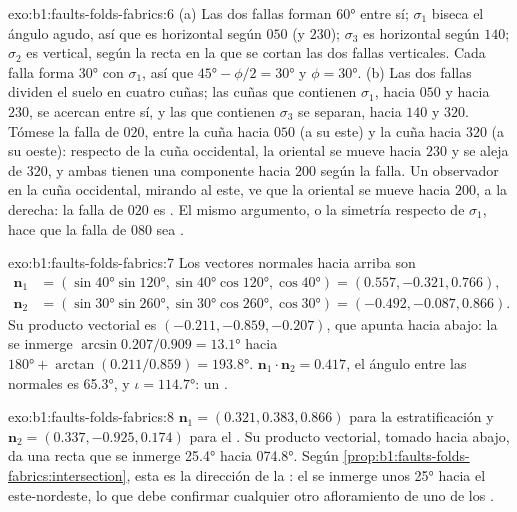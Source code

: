 \begin{solution}{exo:b1:faults-folds-fabrics:6}
(a) Las dos fallas forman \ang{60} entre sí; $\sigma_1$ biseca el ángulo agudo, así que es horizontal según $050$ (y $230$);
$\sigma_3$ es horizontal según $140$; $\sigma_2$ es vertical, según la recta en la que se cortan las dos fallas verticales. Cada
falla forma \ang{30} con $\sigma_1$, así que $\ang{45} - \phi/2 =
\ang{30}$ y $\phi = \ang{30}$. (b) Las dos fallas dividen el suelo en cuatro
cuñas; las cuñas que contienen $\sigma_1$, hacia $050$ y hacia $230$, se acercan entre sí, y las que contienen $\sigma_3$ se separan,
hacia $140$ y $320$. Tómese la falla de  $020$, entre la cuña hacia $050$ (a su
este) y la cuña hacia $320$ (a su oeste): respecto de la cuña occidental, la oriental se
mueve hacia $230$ y se aleja de $320$, y ambas tienen una componente hacia $200$ según la falla. Un observador en la cuña
occidental, mirando al este, ve que la oriental se mueve hacia $200$, a la derecha: la falla de  $020$ es
. El mismo argumento, o la simetría respecto de $\sigma_1$, hace que la falla de  $080$ sea .
\end{solution}

\begin{solution}{exo:b1:faults-folds-fabrics:7}
Los vectores normales hacia arriba son
\begin{align*}
  \mathbf n_1 &= (\sin\ang{40}\sin\ang{120}, \sin\ang{40}\cos\ang{120}, \cos\ang{40}) = (0.557, -0.321, 0.766),\\
  \mathbf n_2 &= (\sin\ang{30}\sin\ang{260}, \sin\ang{30}\cos\ang{260}, \cos\ang{30}) = (-0.492, -0.087, 0.866).
\end{align*}
Su producto vectorial es
$(-0.211, -0.859, -0.207)$, que apunta hacia abajo: la  se inmerge
$\arcsin 0.207/0.909 = \ang{13.1}$ hacia $\ang{180} + \arctan(0.211/0.859) =
\ang{193.8}$. $\mathbf n_1\cdot\mathbf n_2 = 0.417$, el ángulo entre las
normales es \ang{65.3}, y $\iota = \ang{114.7}$: un .
\end{solution}

\begin{solution}{exo:b1:faults-folds-fabrics:8}
$\mathbf n_1 = (0.321, 0.383, 0.866)$ para la estratificación y
$\mathbf n_2 = (0.337, -0.925, 0.174)$ para el . Su producto vectorial, tomado hacia abajo, da una recta que se inmerge \ang{25.4}
hacia \ang{074.8}. Según \cref{prop:b1:faults-folds-fabrics:intersection}, esta es la dirección de la : el  se inmerge unos
\ang{25} hacia el este-nordeste, lo que debe confirmar cualquier otro afloramiento de uno de los .
\end{solution}

